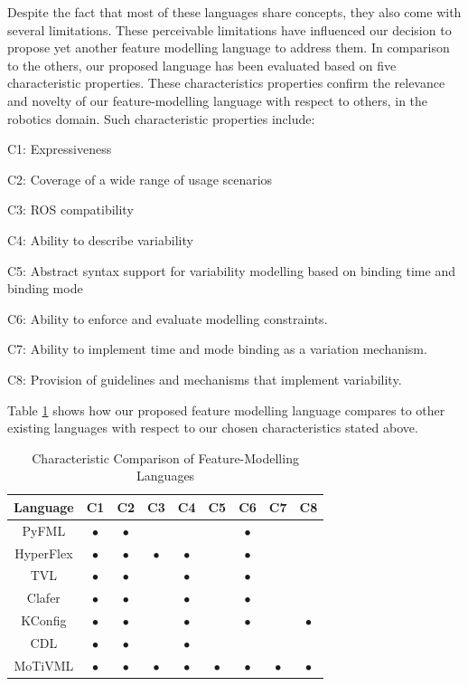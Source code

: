 \documentclass[conference]{IEEEtran}
\begin{document}
Despite the fact that most of these languages share concepts, they also come with several limitations. These perceivable limitations have influenced our decision to propose yet another feature modelling language to address them. In comparison to the others, our proposed language has been evaluated based on five characteristic properties. These characteristics properties confirm the relevance and novelty of our feature-modelling language with respect to others, in the robotics domain. Such characteristic properties include:
\begin{enumerate*}[label=(\roman*)]
	\item C1: Expressiveness
	\item C2: Coverage of a wide range of usage scenarios
	\item C3: ROS compatibility
	\item C4: Ability to describe variability
	\item C5: Abstract syntax support for variability modelling based on binding time and binding mode
	\item C6: Ability to enforce and evaluate modelling constraints.
	\item C7: Ability to implement time and mode binding as a variation mechanism.
	\item C8: Provision of guidelines and mechanisms that implement variability.
\end{enumerate*}

Table \ref{tab:compfml} shows how our proposed feature modelling language compares to other existing languages with respect to our chosen characteristics stated above.
\begin{table}[htbp]
\caption{Characteristic Comparison of Feature-Modelling Languages}
\begin{center}
\begin{tabular}{|c|c|c|c|c|c|c|c|c|}
\hline
    Language & C1 & C2 & C3 & C4 & C5 & C6 & C7 & C8 \\ \hline
    PyFML & $\bullet$ & $\bullet$ &  &  & & $\bullet$ & &\\\hline
    HyperFlex & $\bullet$ & $\bullet$ & $\bullet$ & $\bullet$ &  & $\bullet$ & &\\\hline
    TVL & $\bullet$ & $\bullet$ &  & $\bullet$ & & $\bullet$ & &\\ \hline
    Clafer & $\bullet$ & $\bullet$ &  & $\bullet$ &  & $\bullet$ & &\\ \hline
    KConfig & $\bullet$ & $\bullet$ & & $\bullet$ &  & $\bullet$ & & $\bullet$\\ \hline
    CDL & $\bullet$ & $\bullet$ &  &  $\bullet$ &  & & &\\ \hline
    MoTiVML & $\bullet$ & $\bullet$ & $\bullet$ & $\bullet$ & $\bullet$ & $\bullet$ & $\bullet$ & $\bullet$\\ \hline
\end{tabular}
\label{tab:compfml}
\end{center}
\end{table}
\end{document}
